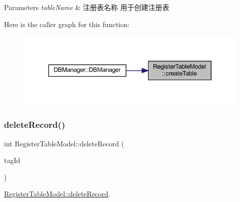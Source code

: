\begin{DoxyParams}{Parameters}
{\em table\+Name} & 注册表名称 用于创建注册表 \\
\hline
\end{DoxyParams}
Here is the caller graph for this function\+:
\nopagebreak
\begin{figure}[H]
\begin{center}
\leavevmode
\includegraphics[width=343pt]{class_register_table_model_ace2abb791a29dcb909072d1a038b8241_icgraph}
\end{center}
\end{figure}
\mbox{\label{class_register_table_model_a5bc3bbf6efa90e52e7759ddf89e8d6bb}} 
\subsubsection{\texorpdfstring{deleteRecord()}{deleteRecord()}}
{\footnotesize\ttfamily int Register\+Table\+Model\+::delete\+Record (\begin{DoxyParamCaption}\item[{Q\+String \&}]{tag\+Id }\end{DoxyParamCaption})}



\mbox{\hyperlink{class_register_table_model_a5bc3bbf6efa90e52e7759ddf89e8d6bb}{Register\+Table\+Model\+::delete\+Record}}. 


